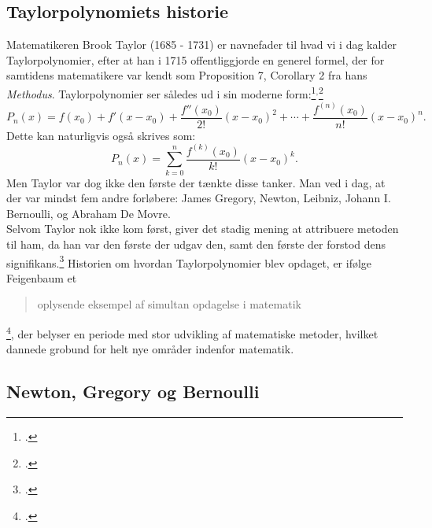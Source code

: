 \documentclass[12pt, a4paper]{article}
\begin{document}
\begin{refsection}
\section{Taylorpolynomiets historie} %
Matematikeren Brook Taylor (1685 - 1731) er navnefader til hvad vi i dag kalder Taylorpolynomier, efter at han i 1715 offentliggjorde en generel formel, der for samtidens matematikere var kendt som Proposition 7, Corollary 2 fra hans \textit{Methodus}.
Taylorpolynomier ser således ud i sin moderne form:\footcite[s. 247]{roy_2021}$^,$\footcite[s. 72]{feigenbaum_exact_sciences}
\begin{equation*}
   P_n(x)=f(x_0)+f'(x-x_0)+\frac{f''(x_0)}{2!}(x-x_0)^2+\cdots +\frac{f^{(n)}(x_0)}{n!}(x-x_0)^n. 
\end{equation*}
Dette kan naturligvis også skrives som:
\begin{equation*}
    P_n(x)=\sum_{k=0}^{n}\frac{f^{(k)}(x_0)}{k!}(x-x_0)^k.
\end{equation*}
Men Taylor var dog ikke den første der tænkte disse tanker. Man ved i dag, at der var mindst fem andre forløbere: James Gregory, Newton, Leibniz, Johann I. Bernoulli, og Abraham De Movre.\\
Selvom Taylor nok ikke kom først, giver det stadig mening at attribuere metoden til ham, da han var den første der udgav den, samt den første der forstod dens signifikans.\footcite[s. 196]{alma99122953280205763} Historien om hvordan Taylorpolynomier blev opdaget, er ifølge Feigenbaum et \blockquote{oplysende eksempel af simultan opdagelse i matematik}\footcite[s. 112]{alma99122953280205763}, der belyser en periode med stor udvikling af matematiske metoder, hvilket dannede grobund for helt nye områder indenfor matematik.
\subsection{Newton, Gregory og Bernoulli}


\end{refsection}
\end{document}
